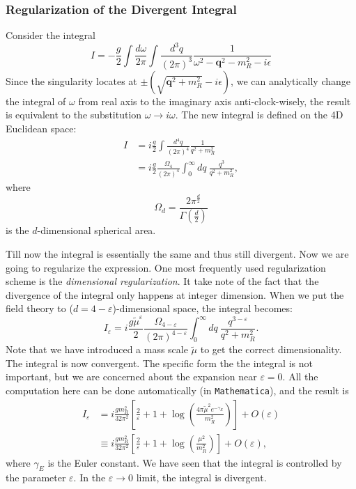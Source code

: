 \subsubsection{Regularization of the Divergent Integral}
Consider the integral
\begin{equation}
	I = -\frac{g}{2} \int\frac{d \omega}{2\pi} \int\frac{d^3 q}{(2\pi)^3} \frac{1}{\omega^2 - \bm q^2-m_R^2 -i\epsilon}
\end{equation}
Since the singularity locates at $\pm(\sqrt{\bm q^2+m_R^2}-i\epsilon)$, we can analytically change the integral of $\omega$ from real axis to the imaginary axis anti-clock-wisely, the result is equivalent to the substitution $\omega \rightarrow i\omega$.
The new integral is defined on the 4D Euclidean space:
\begin{equation}
\begin{aligned}
	I &= i \frac{g}{2} \int \frac{d^4 q}{(2\pi)^4} \frac{1}{q^2 + m_R^2} \\
	&= i\frac{g}{2} \frac{\Omega_4}{(2\pi)^4} \int_0^\infty dq \ \frac{q^3}{q^2 + m^2_R},
\end{aligned}
\end{equation}
where 
\begin{equation}
	\Omega_d = \frac{2 \pi^{\frac{d}{2}}}{\Gamma\left(\frac{d}{2}\right)}
\end{equation}
is the $d$-dimensional spherical area.

Till now the integral is essentially the same and thus still divergent.
Now we are going to regularize the expression.
One most frequently used regularization scheme is the \textit{dimensional regularization}.
It take note of the fact that the divergence of the integral only happens at integer dimension.
When we put the field theory to ($d=4-\varepsilon$)-dimensional space, the integral becomes:
\begin{equation}
	I_\varepsilon = i\frac{g\tilde{\mu}^\varepsilon}{2}\frac{\Omega_{4-\varepsilon}}{(2\pi)^{4-\varepsilon}} \int_0^\infty dq\ \frac{q^{3-\varepsilon}}{q^2+m_R^2}.
\end{equation}
Note that we have introduced a mass scale $\tilde\mu$ to get the correct dimensionality.
The integral is now convergent.
The specific form the the integral is not important, but we are concerned about the expansion near $\varepsilon = 0$. 
All the computation here can be done automatically (in \texttt{Mathematica}), and the result is
\begin{equation}
\begin{aligned}
	I_\varepsilon &= i\frac{g m_R^2}{32\pi^2} \left[\frac{2}{\varepsilon}+1+\log \left(\frac{4 \pi \tilde{\mu}^2 e^{-\gamma_E}}{m_R^2}\right)\right] + O(\varepsilon) \\
	&\equiv i\frac{g m_R^2}{32\pi^2} \left[\frac{2}{\varepsilon}+1+\log \left(\frac{\mu^2}{m_R^2}\right)\right] + O(\varepsilon),
\end{aligned}
\end{equation}
where $\gamma_E$ is the Euler constant. 
We have seen that the integral is controlled by the parameter $\varepsilon$.
In the $\varepsilon \rightarrow 0$ limit, the integral is divergent.


